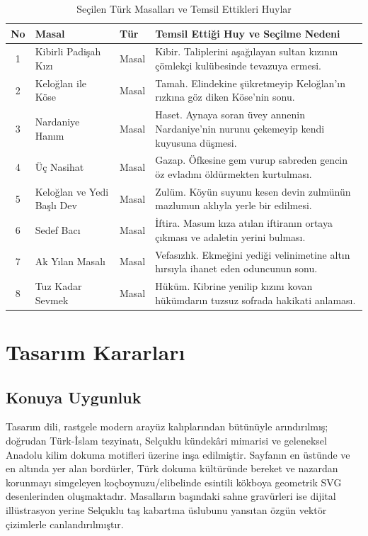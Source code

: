 \documentclass[11pt,a4paper]{article}
\begin{document}
\begin{table}[h!]
\centering
\small
\begin{tabularx}{\textwidth}{cllX}
\toprule
\textbf{No} & \textbf{Masal} & \textbf{Tür} & \textbf{Temsil Ettiği Huy ve Seçilme Nedeni} \\
\midrule
1 & Kibirli Padişah Kızı & Masal & Kibir. Taliplerini aşağılayan sultan kızının çömlekçi kulübesinde tevazuya ermesi. \\
2 & Keloğlan ile Köse & Masal & Tamah. Elindekine şükretmeyip Keloğlan'ın rızkına göz diken Köse'nin sonu. \\
3 & Nardaniye Hanım & Masal & Haset. Aynaya soran üvey annenin Nardaniye'nin nurunu çekemeyip kendi kuyusuna düşmesi. \\
4 & Üç Nasihat & Masal & Gazap. Öfkesine gem vurup sabreden gencin öz evladını öldürmekten kurtulması. \\
5 & Keloğlan ve Yedi Başlı Dev & Masal & Zulüm. Köyün suyunu kesen devin zulmünün mazlumun aklıyla yerle bir edilmesi. \\
6 & Sedef Bacı & Masal & İftira. Masum kıza atılan iftiranın ortaya çıkması ve adaletin yerini bulması. \\
7 & Ak Yılan Masalı & Masal & Vefasızlık. Ekmeğini yediği velinimetine altın hırsıyla ihanet eden oduncunun sonu. \\
8 & Tuz Kadar Sevmek & Masal & Hüküm. Kibrine yenilip kızını kovan hükümdarın tuzsuz sofrada hakikati anlaması. \\
\bottomrule
\end{tabularx}
\caption{Seçilen Türk Masalları ve Temsil Ettikleri Huylar}
\end{table}

\section{Tasarım Kararları}

\subsection{Konuya Uygunluk}
Tasarım dili, rastgele modern arayüz kalıplarından bütünüyle arındırılmış; doğrudan Türk-İslam tezyinatı, Selçuklu kündekâri mimarisi ve geleneksel Anadolu kilim dokuma motifleri üzerine inşa edilmiştir. Sayfanın en üstünde ve en altında yer alan bordürler, Türk dokuma kültüründe bereket ve nazardan korunmayı simgeleyen koçboynuzu/elibelinde esintili kökboya geometrik SVG desenlerinden oluşmaktadır. Masalların başındaki sahne gravürleri ise dijital illüstrasyon yerine Selçuklu taş kabartma üslubunu yansıtan özgün vektör çizimlerle canlandırılmıştır.
\end{document}
